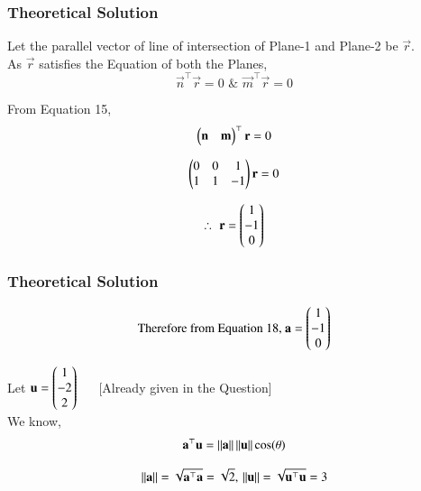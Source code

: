 \documentclass{beamer}
\begin{document}
\begin{frame}[fragile]
\frametitle{Theoretical Solution}

Let the parallel vector of line of intersection of Plane-1 and Plane-2 be $\vec{r}$.\\

As $\vec{r}$ satisfies the Equation of both the Planes,
\begin{equation}
    \vec{n}^\top\vec{r}=0 \, \, \& \, \, \vec{m}^\top\vec{r}=0
\end{equation}

From Equation 15,
\begin{equation}
    \begin{pmatrix}\mathbf{n} & \mathbf{m}\end{pmatrix}^\top\mathbf{r}=0
\end{equation}

\begin{equation}
\begin{pmatrix} 0 & 0 & 1 \\ 1 & 1 & -1\end{pmatrix}\mathbf{r}  =0
\end{equation}

\begin{equation}
    \therefore \, \, \mathbf{r} = \begin{pmatrix} 1 \\ -1 \\ 0\end{pmatrix}
\end{equation}
\end{frame}




\begin{frame}[fragile]
\frametitle{Theoretical Solution}
\begin{equation}
\text{Therefore from Equation 18, } \mathbf{a} = \begin{pmatrix}1 \\ -1 \\ 0\end{pmatrix}    
\end{equation}

Let $\mathbf{u} = \begin{pmatrix}1 \\ -2 \\ 2\end{pmatrix}$ $\quad$ [Already given in the Question]\\

We know,
\begin{equation}
    \mathbf{a}^\top\mathbf{u} = \left\lVert\mathbf{a}\right\rVert\left\lVert\mathbf{u}\right\rVert\cos(\theta)
\end{equation}

\begin{equation}
    \left\lVert\mathbf{a}\right\rVert = \sqrt{\mathbf{a}^\top\mathbf{a}} = \sqrt{2}, \, \left\lVert\mathbf{u}\right\rVert = \sqrt{\mathbf{u}^\top\mathbf{u}} = 3
\end{equation}\\
\end{frame}
\end{document}
